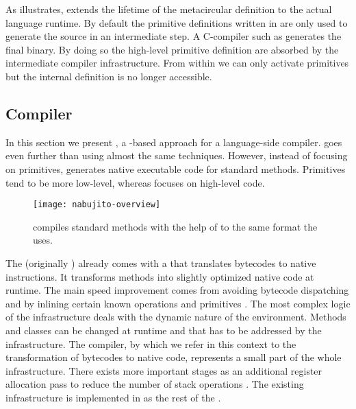 As  illustrates, \WF extends the lifetime of the metacircular \VM definition to the actual language runtime.
By default the primitive definitions written in \Slang are only used to generate the \VM source in an intermediate step.
A C-compiler such as \GCC generates the final binary.
By doing so the high-level primitive definition are absorbed by the intermediate compiler infrastructure.
From within \PH we can only activate primitives but the internal definition is no longer accessible.




\subsection{\NBJ \JIT Compiler}
In this section we present \NBJ, a \B-based approach for a language-side \JIT compiler.
\NBJ goes even further than \WF using almost the same techniques.
However, instead of focusing on primitives, \NBJ generates native executable code for standard \PH methods.
Primitives tend to be more low-level, whereas \NBJ focuses on high-level \PH code. 


\begin{figure}[h]
	\centering
	\texttt{[image: nabujito-overview]}
	\caption[\NBJ Overview]{\NBJ compiles standard \PH methods with the help of \B to the same format the \VM \JIT uses.}
\end{figure}

\noindent The \PH \VM (originally ) already comes with a \JIT that translates bytecodes to native instructions.
It transforms \PH methods into slightly optimized native code at runtime.
The main speed improvement comes from avoiding bytecode dispatching and by inlining certain known operations and primitives \cite{Ayco03a}.
The most complex logic of the \JIT infrastructure deals with the dynamic nature of the \PH environment.
Methods and classes can be changed at runtime and that has to be addressed by the \JIT infrastructure.
The \JIT compiler, by which we refer in this context to the transformation of bytecodes to native code, represents a small part of the whole infrastructure.
There exists more important stages as an additional register allocation pass to reduce the number of stack operations \cite{Mira99a,Mira11a}.
The existing \JIT infrastructure is implemented in \Slang \cite[Ch.\ 5]{Blac09a} as the rest of the \VM.

